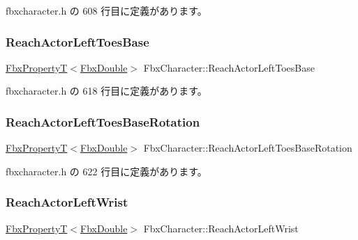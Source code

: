  fbxcharacter.\+h の 608 行目に定義があります。

\mbox{\label{class_fbx_character_abdd985dfc25db8c4ddcdfb3a447f920b}} 
\subsubsection{\texorpdfstring{Reach\+Actor\+Left\+Toes\+Base}{ReachActorLeftToesBase}}
{\footnotesize\ttfamily \hyperlink{class_fbx_property_t}{Fbx\+PropertyT}$<$\hyperlink{fbxtypes_8h_a171e72a1c46fc15c1a6c9c31948c1c5b}{Fbx\+Double}$>$ Fbx\+Character\+::\+Reach\+Actor\+Left\+Toes\+Base}



 fbxcharacter.\+h の 618 行目に定義があります。

\mbox{\label{class_fbx_character_a10ef759e4dbd99019568422aa692f16f}} 
\subsubsection{\texorpdfstring{Reach\+Actor\+Left\+Toes\+Base\+Rotation}{ReachActorLeftToesBaseRotation}}
{\footnotesize\ttfamily \hyperlink{class_fbx_property_t}{Fbx\+PropertyT}$<$\hyperlink{fbxtypes_8h_a171e72a1c46fc15c1a6c9c31948c1c5b}{Fbx\+Double}$>$ Fbx\+Character\+::\+Reach\+Actor\+Left\+Toes\+Base\+Rotation}



 fbxcharacter.\+h の 622 行目に定義があります。

\mbox{\label{class_fbx_character_ae5118a968608a6c1a7b786e978583cee}} 
\subsubsection{\texorpdfstring{Reach\+Actor\+Left\+Wrist}{ReachActorLeftWrist}}
{\footnotesize\ttfamily \hyperlink{class_fbx_property_t}{Fbx\+PropertyT}$<$\hyperlink{fbxtypes_8h_a171e72a1c46fc15c1a6c9c31948c1c5b}{Fbx\+Double}$>$ Fbx\+Character\+::\+Reach\+Actor\+Left\+Wrist}



